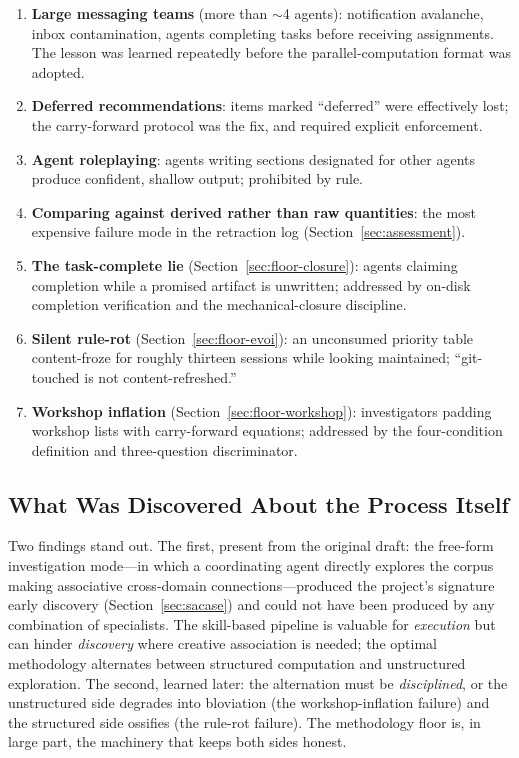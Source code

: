 \documentclass[12pt,a4paper]{article}
\begin{document}
\begin{enumerate}
    \item \textbf{Large messaging teams} (more than $\sim$4 agents): notification avalanche, inbox contamination, agents completing tasks before receiving assignments. The lesson was learned repeatedly before the parallel-computation format was adopted.
    \item \textbf{Deferred recommendations}: items marked ``deferred'' were effectively lost; the carry-forward protocol was the fix, and required explicit enforcement.
    \item \textbf{Agent roleplaying}: agents writing sections designated for other agents produce confident, shallow output; prohibited by rule.
    \item \textbf{Comparing against derived rather than raw quantities}: the most expensive failure mode in the retraction log (Section~\ref{sec:assessment}).
    \item \textbf{The task-complete lie} (Section~\ref{sec:floor-closure}): agents claiming completion while a promised artifact is unwritten; addressed by on-disk completion verification and the mechanical-closure discipline.
    \item \textbf{Silent rule-rot} (Section~\ref{sec:floor-evoi}): an unconsumed priority table content-froze for roughly thirteen sessions while looking maintained; ``git-touched is not content-refreshed.''
    \item \textbf{Workshop inflation} (Section~\ref{sec:floor-workshop}): investigators padding workshop lists with carry-forward equations; addressed by the four-condition definition and three-question discriminator.
\end{enumerate}

\subsection{What Was Discovered About the Process Itself}

Two findings stand out. The first, present from the original draft: the free-form investigation mode---in which a coordinating agent directly explores the corpus making associative cross-domain connections---produced the project's signature early discovery (Section~\ref{sec:sacase}) and could not have been produced by any combination of specialists. The skill-based pipeline is valuable for \emph{execution} but can hinder \emph{discovery} where creative association is needed; the optimal methodology alternates between structured computation and unstructured exploration. The second, learned later: the alternation must be \emph{disciplined}, or the unstructured side degrades into bloviation (the workshop-inflation failure) and the structured side ossifies (the rule-rot failure). The methodology floor is, in large part, the machinery that keeps both sides honest.
\end{document}
